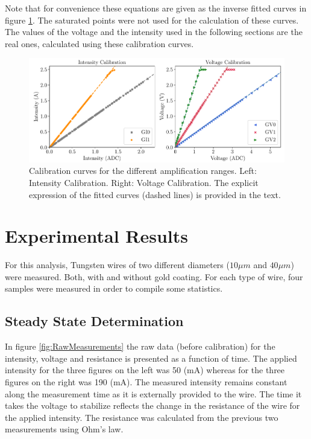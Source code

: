 Note that for convenience these equations are given as the inverse fitted curves in figure \ref{fig:CalibrationCurves}. The saturated points were not used for the calculation of these curves. The values of the voltage and the intensity used in the following sections are the real ones, calculated using these calibration curves.

\begin{figure}[h]
    \centering
    \includegraphics[width=1.0\columnwidth]{Figure_CalibrationCurves/CalCurve.pdf}
    \caption{Calibration curves for the different amplification ranges. Left: Intensity Calibration. Right: Voltage Calibration. The explicit expression of the fitted curves (dashed lines) is provided in the text. }
    \label{fig:CalibrationCurves}
\end{figure}

\section{Experimental Results}

For this analysis, Tungsten wires of two different diameters ($10 \mu m$ and $40 \mu m$) were measured. Both, with and without gold coating. For each type of wire, four samples were measured in order to compile some statistics. 

\subsection{Steady State Determination}

In figure \ref{fig:RawMeasurements} the raw data (before calibration) for the intensity, voltage and resistance is presented as a function of time. The applied intensity for the three figures on the left was 50 (mA) whereas for the three figures on the right was 190 (mA). The measured intensity remains constant along the measurement time as it is externally provided to the wire. The time it takes the voltage to stabilize reflects the change in the resistance of the wire for the applied intensity. The resistance was calculated from the previous two measurements using Ohm's law. 

